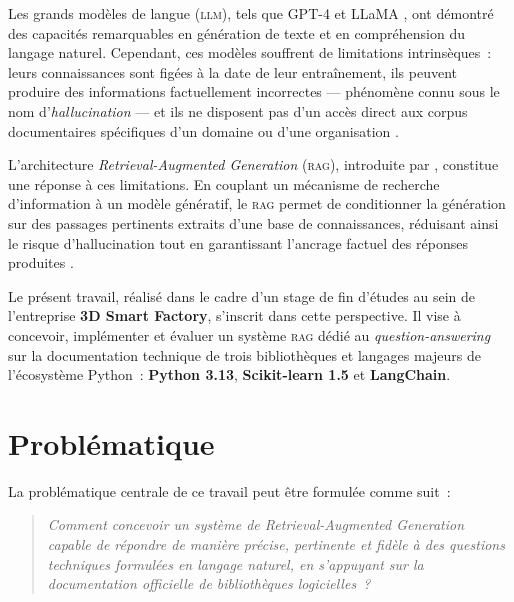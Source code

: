 \documentclass[12pt,a4paper,oneside]{report}
\newcommand{\rag}{\textsc{rag}}
\newcommand{\llm}{\textsc{llm}}
\begin{document}
Les grands modèles de langue (\llm{}), tels que GPT-4 \citep{openai2023gpt4} et LLaMA \citep{touvron2023llama}, ont démontré des capacités remarquables en génération de texte et en compréhension du langage naturel. Cependant, ces modèles souffrent de limitations intrinsèques~: leurs connaissances sont figées à la date de leur entraînement, ils peuvent produire des informations factuellement incorrectes --- phénomène connu sous le nom d'\textit{hallucination} --- et ils ne disposent pas d'un accès direct aux corpus documentaires spécifiques d'un domaine ou d'une organisation \citep{lewis2020}.

L'architecture \textit{Retrieval-Augmented Generation} (\rag{}), introduite par \citet{lewis2020}, constitue une réponse à ces limitations. En couplant un mécanisme de recherche d'information à un modèle génératif, le \rag{} permet de conditionner la génération sur des passages pertinents extraits d'une base de connaissances, réduisant ainsi le risque d'hallucination tout en garantissant l'ancrage factuel des réponses produites \citep{gao2024}.

Le présent travail, réalisé dans le cadre d'un stage de fin d'études au sein de l'entreprise \textbf{3D Smart Factory}, s'inscrit dans cette perspective. Il vise à concevoir, implémenter et évaluer un système \rag{} dédié au \textit{question-answering} sur la documentation technique de trois bibliothèques et langages majeurs de l'écosystème Python~: \textbf{Python 3.13}, \textbf{Scikit-learn 1.5} et \textbf{LangChain}.

\section{Problématique}

La problématique centrale de ce travail peut être formulée comme suit~:

\begin{quote}
\textit{Comment concevoir un système de Retrieval-Augmented Generation capable de répondre de manière précise, pertinente et fidèle à des questions techniques formulées en langage naturel, en s'appuyant sur la documentation officielle de bibliothèques logicielles~?}
\end{quote}
\end{document}

